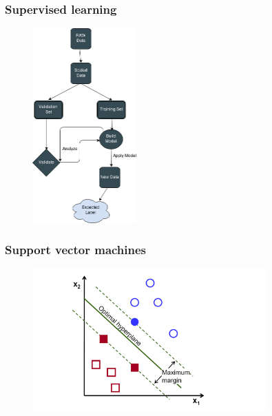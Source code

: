 \documentclass{beamer}
\begin{document}

\begin{frame}
\frametitle{Supervised learning}

	\begin{figure}
		\centering
    	\includegraphics[width=40mm,scale=1]{./img/SL.png}
	\end{figure}

\end{frame}


\begin{frame}
\frametitle{Support vector machines}

	\begin{figure}
		\centering
    	\includegraphics[width=90mm,scale=1]{./img/SVM.png}
	\end{figure}

\end{frame}

\end{document}

